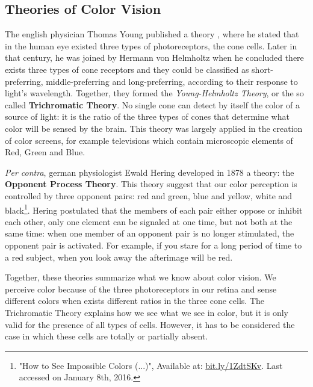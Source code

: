 \documentclass{report}
\begin{document}
\subsection{Theories of Color Vision}
The english physician Thomas Young published a theory \cite{Young1802}, where he stated that
in the human eye existed three types of photoreceptors, the cone cells. Later in that century, he was
joined by Hermann von Helmholtz when he concluded there exists three types of cone receptors and they could
be classified as short-preferring, middle-preferring and long-preferring, according to their response to
light’s wavelength. Together, they formed the \emph{Young-Helmholtz Theory}, or the so called \textbf{Trichromatic Theory}.
No single cone can detect by itself the color of a source of light: it is the ratio of the three types of cones that
determine what color will be sensed by the brain. This theory was largely applied in the creation of color
screens, for example televisions which contain microscopic elements of Red, Green and Blue. \par
\emph{Per contra}, german physiologist Ewald Hering developed in 1878 a theory: the
\textbf{Opponent Process Theory}. This theory suggest that our color perception is controlled by three
opponent pairs: red and green, blue and yellow, white and black\footnote{"How to See Impossible Colors (...)", Available at: \url{bit.ly/1ZdtSKv}. Last accessed on January 8th, 2016.}. Hering postulated that the members of each
pair either oppose or inhibit each other, only one element can be signaled at one time, but not both at the
same time: when one member of an opponent pair is no longer stimulated, the opponent pair is activated. For
example, if you stare for a long period of time to a red subject, when you look away the afterimage will be
red. \par
Together, these theories summarize what we know about color vision. We perceive color because of the three
photoreceptors in our retina and sense different colors when exists different ratios in the three cone
cells. The Trichromatic Theory explains how we see what we see in color, but it is only valid for the
presence of all types of cells. However, it has to be considered the case in which these cells are totally or partially absent.
%
\end{document}
